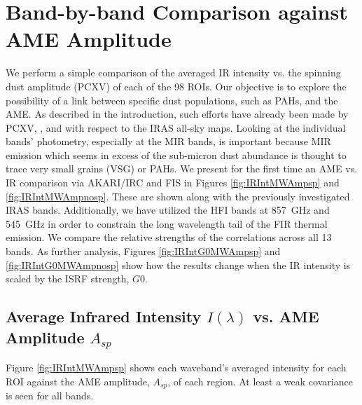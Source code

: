 \section{Band-by-band Comparison against AME Amplitude}
     We perform a simple comparison of the averaged IR intensity vs. the spinning dust amplitude (PCXV) of each of the 98 ROIs. Our objective is to explore the possibility of a link between specific dust populations, such as PAHs, and the AME. As described in the introduction, such efforts have already been made by PCXV, \cite{leitch98}, and \cite{ysard10a} with respect to the IRAS all-sky maps. Looking at the individual bands' photometry, especially at the MIR bands, is important because MIR emission which seems in excess of the sub-micron dust abundance is thought to trace very small grains (VSG) or PAHs. 
     We present for the first time an AME vs. IR comparison via AKARI/IRC and FIS in Figures \ref{fig:IRIntMWAmpsp} and \ref{fig:IRIntMWAmpnosp}. These are shown along with the previously investigated IRAS bands. Additionally, we have utilized the HFI bands at 857~GHz and 545~GHz in order to constrain the long wavelength tail of the FIR thermal emission. We compare the relative strengths of the correlations across all 13 bands. As further analysis, Figures \ref{fig:IRIntG0MWAmpsp} and \ref{fig:IRIntG0MWAmpnosp} show how the results change when the IR intensity is scaled by the ISRF strength, $G0$.

\subsection{Average Infrared Intensity $I({\lambda})$ vs. AME Amplitude $A_{sp}$}
Figure \ref{fig:IRIntMWAmpsp} shows each waveband's averaged intensity for each ROI against the AME amplitude, $A_{sp}$, of each region. At least a weak covariance is seen for all bands.

